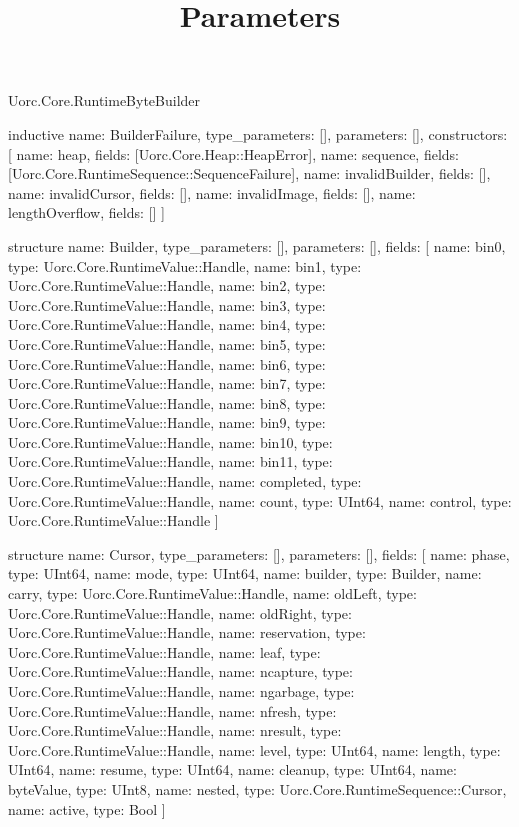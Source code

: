 \begin{lexlean}{Uorc.Core.RuntimeByteBuilder}
\title{Parameters}
\begin{semanticmodule}
inductive{
  name: BuilderFailure,
  type_parameters: [],
  parameters: [],
  constructors: [
    {name: heap, fields: [Uorc.Core.Heap::HeapError]},
    {name: sequence, fields: [Uorc.Core.RuntimeSequence::SequenceFailure]},
    {name: invalidBuilder, fields: []},
    {name: invalidCursor, fields: []},
    {name: invalidImage, fields: []},
    {name: lengthOverflow, fields: []}
  ]
}

structure{
  name: Builder,
  type_parameters: [],
  parameters: [],
  fields: [
    {name: bin0, type: Uorc.Core.RuntimeValue::Handle},
    {name: bin1, type: Uorc.Core.RuntimeValue::Handle},
    {name: bin2, type: Uorc.Core.RuntimeValue::Handle},
    {name: bin3, type: Uorc.Core.RuntimeValue::Handle},
    {name: bin4, type: Uorc.Core.RuntimeValue::Handle},
    {name: bin5, type: Uorc.Core.RuntimeValue::Handle},
    {name: bin6, type: Uorc.Core.RuntimeValue::Handle},
    {name: bin7, type: Uorc.Core.RuntimeValue::Handle},
    {name: bin8, type: Uorc.Core.RuntimeValue::Handle},
    {name: bin9, type: Uorc.Core.RuntimeValue::Handle},
    {name: bin10, type: Uorc.Core.RuntimeValue::Handle},
    {name: bin11, type: Uorc.Core.RuntimeValue::Handle},
    {name: completed, type: Uorc.Core.RuntimeValue::Handle},
    {name: count, type: UInt64},
    {name: control, type: Uorc.Core.RuntimeValue::Handle}
  ]
}

structure{
  name: Cursor,
  type_parameters: [],
  parameters: [],
  fields: [
    {name: phase, type: UInt64},
    {name: mode, type: UInt64},
    {name: builder, type: Builder},
    {name: carry, type: Uorc.Core.RuntimeValue::Handle},
    {name: oldLeft, type: Uorc.Core.RuntimeValue::Handle},
    {name: oldRight, type: Uorc.Core.RuntimeValue::Handle},
    {name: reservation, type: Uorc.Core.RuntimeValue::Handle},
    {name: leaf, type: Uorc.Core.RuntimeValue::Handle},
    {name: ncapture, type: Uorc.Core.RuntimeValue::Handle},
    {name: ngarbage, type: Uorc.Core.RuntimeValue::Handle},
    {name: nfresh, type: Uorc.Core.RuntimeValue::Handle},
    {name: nresult, type: Uorc.Core.RuntimeValue::Handle},
    {name: level, type: UInt64},
    {name: length, type: UInt64},
    {name: resume, type: UInt64},
    {name: cleanup, type: UInt64},
    {name: byteValue, type: UInt8},
    {name: nested, type: Uorc.Core.RuntimeSequence::Cursor},
    {name: active, type: Bool}
  ]
}


\end{semanticmodule}
\end{lexlean}
